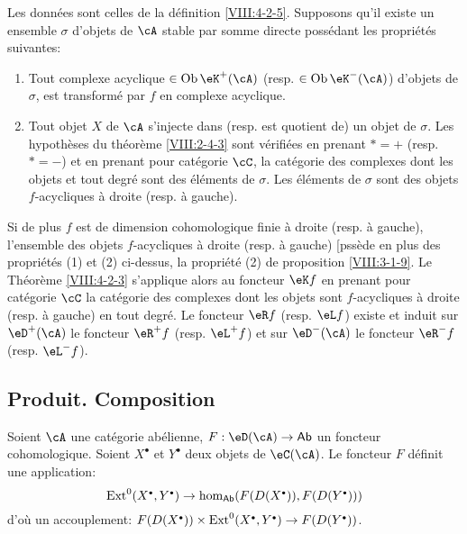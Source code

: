 \begin{corollary}\label{VIII:4-2-3-2} %
Les données sont celles de la définition \ref{VIII:4-2-5}. Supposons qu'il 
existe un ensemble $\sigma$ d'objets de $\cA$ stable par somme directe 
possédant les propriétés suivantes: 
\begin{enumerate}
  \item Tout complexe acyclique $\in \operatorname{Ob}{\eK^+(\cA)}$ (resp. 
    $\in\operatorname{Ob}{\eK^-(\cA)}$) d'objets de $\sigma$, est transformé 
    par $f$ en complexe acyclique. 
  \item Tout objet $X$ de $\cA$ s'injecte dans (resp. est quotient de) un objet 
    de $\sigma$. Les hypothèses du théorème \ref{VIII:2-4-3} sont 
    vérifiées en prenant $\ast=+$ (resp. $\ast=-$) et en prenant pour 
    catégorie $\cC$, la catégorie des complexes dont les objets et tout 
    degré sont des éléments de $\sigma$. Les éléments de $\sigma$ 
    sont des objets $f$-acycliques à droite (resp. à gauche). 
\end{enumerate}

Si de plus $f$ est de dimension cohomologique finie à droite (resp. à 
gauche), l'ensemble des objets $f$-acycliques à droite (resp. à gauche) 
[pssède en plus des propriétés (1) et (2) ci-dessus, la propriété 
(2) de proposition \ref{VIII:3-1-9}. Le Théorème \ref{VIII:4-2-3} 
s'applique alors au foncteur $\eK f$ en prenant pour catégorie $\cC$ la 
catégorie des complexes dont les objets sont $f$-acycliques à droite 
(resp. à gauche) en tout degré. Le foncteur $\eR f$ (resp. $\eL f$) existe 
et induit sur $\eD^+(\cA)$ le foncteur $\eR^+ f$ (resp. $\eL^+ f$) et sur 
$\eD^-(\cA)$ le foncteur $\eR^- f$ (resp. $\eL^- f$). 
\end{corollary}










\subsection{Produit. Composition}\label{VIII:4-3}

Soient $\cA$ une catégorie abélienne, $F:\eD(\cA) \to \mathsf{Ab}$ un 
foncteur cohomologique. Soient $X^\bullet$ et $Y^\bullet$ deux objets de 
$\eC(\cA)$. Le foncteur $F$ définit une application: 
\[
  \ext^0(X^\bullet,Y^\bullet) \to \hom_{\mathsf{Ab}}(F(D(X^\bullet)),F(D(Y^\bullet)))
\]
d'où un accouplement: 
$F(D(X^\bullet))\times \ext^0(X^\bullet,Y^\bullet) \to F(D(Y^\bullet))$. 

